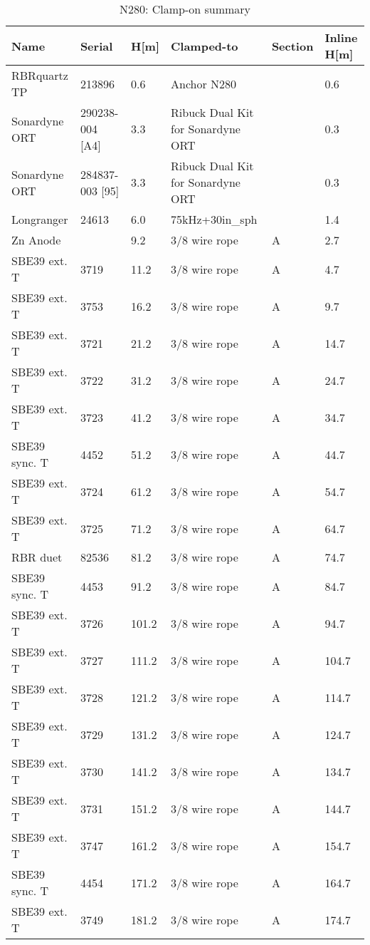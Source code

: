 \documentclass{article}
\begin{document}
\begin{table}[!htbp]
\centering
\caption{N280: Clamp-on summary}
\begin{tabular}{llllll}
\toprule
Name & Serial & H[m] & Clamped-to & Section & Inline H[m] \\
\midrule
RBRquartz TP & 213896 & 0.6 & Anchor N280 &  & 0.6 \\
Sonardyne ORT & 290238-004 [A4] & 3.3 & Ribuck Dual Kit for Sonardyne ORT &  & 0.3 \\
Sonardyne ORT & 284837-003 [95] & 3.3 & Ribuck Dual Kit for Sonardyne ORT &  & 0.3 \\
Longranger & 24613 & 6.0 & 75kHz+30in\_sph &  & 1.4 \\
Zn Anode &  & 9.2 & 3/8 wire rope & A & 2.7 \\
SBE39 ext. T & 3719 & 11.2 & 3/8 wire rope & A & 4.7 \\
SBE39 ext. T & 3753 & 16.2 & 3/8 wire rope & A & 9.7 \\
SBE39 ext. T & 3721 & 21.2 & 3/8 wire rope & A & 14.7 \\
SBE39 ext. T & 3722 & 31.2 & 3/8 wire rope & A & 24.7 \\
SBE39 ext. T & 3723 & 41.2 & 3/8 wire rope & A & 34.7 \\
SBE39 sync. T & 4452 & 51.2 & 3/8 wire rope & A & 44.7 \\
SBE39 ext. T & 3724 & 61.2 & 3/8 wire rope & A & 54.7 \\
SBE39 ext. T & 3725 & 71.2 & 3/8 wire rope & A & 64.7 \\
RBR duet & 82536 & 81.2 & 3/8 wire rope & A & 74.7 \\
SBE39 sync. T & 4453 & 91.2 & 3/8 wire rope & A & 84.7 \\
SBE39 ext. T & 3726 & 101.2 & 3/8 wire rope & A & 94.7 \\
SBE39 ext. T & 3727 & 111.2 & 3/8 wire rope & A & 104.7 \\
SBE39 ext. T & 3728 & 121.2 & 3/8 wire rope & A & 114.7 \\
SBE39 ext. T & 3729 & 131.2 & 3/8 wire rope & A & 124.7 \\
SBE39 ext. T & 3730 & 141.2 & 3/8 wire rope & A & 134.7 \\
SBE39 ext. T & 3731 & 151.2 & 3/8 wire rope & A & 144.7 \\
SBE39 ext. T & 3747 & 161.2 & 3/8 wire rope & A & 154.7 \\
SBE39 sync. T & 4454 & 171.2 & 3/8 wire rope & A & 164.7 \\
SBE39 ext. T & 3749 & 181.2 & 3/8 wire rope & A & 174.7 \\

\end{tabular}
\end{table}
\end{document}
